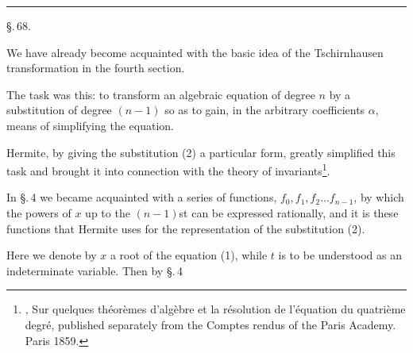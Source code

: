 
\begin{center}


\rule{4cm}{0.4pt}

\S.\,68.

\end{center}

We have already become acquainted with the basic idea of the
Tschirnhausen transformation in the fourth section.

The task was this: to transform an algebraic equation of degree $n$
by a substitution of degree $(n-1)$
so as to gain, in the arbitrary coefficients $\alpha$, means of
simplifying the equation.

Hermite, by giving the substitution (2) a particular form, greatly
simplified this task and brought it into connection with the theory of
invariants\footnote{, Sur quelques th\'eor\`emes d'alg\`ebre et la r\'esolution de
l'\'equation du quatri\`eme degr\'e, published separately from the Comptes rendus of the Paris Academy. Paris 1859.}.

In \S.\,4 we became acquainted with a series of functions,
$f_0, f_1, f_2 \ldots f_{n-1}$, by which the powers of $x$ up to the
$(n-1)$st can be expressed rationally, and it is these functions
that Hermite uses for the representation of the substitution (2).

Here we denote by $x$ a root of the equation (1),
while $t$ is to be understood as an indeterminate variable.
Then by \S.\,4
